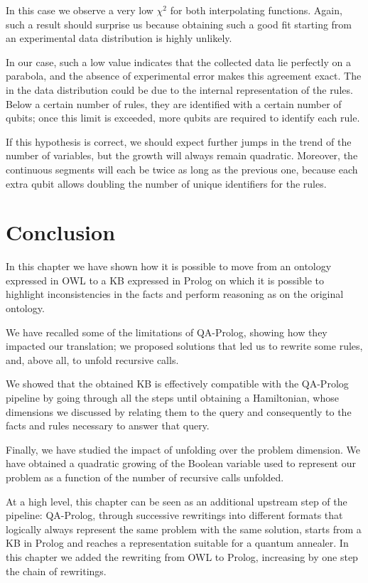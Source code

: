 In this case we observe a very low $\chi^2$ for both interpolating functions. Again, such a result should surprise us because obtaining such a good fit starting from an experimental data distribution is highly unlikely. 

In our case, such a low value indicates that the collected data lie perfectly on a parabola, and the absence of experimental error makes this agreement exact. The  in the data distribution could be due to the internal representation of the rules. Below a certain number of rules, they are identified with a certain number of qubits; once this limit is exceeded, more qubits are required to identify each rule. 

If this hypothesis is correct, we should expect further jumps in the trend of the number of variables, but the growth will always remain quadratic. Moreover, the continuous segments will each be twice as long as the previous one, because each extra qubit allows doubling the number of unique identifiers for the rules.

\section{Conclusion}
In this chapter we have shown how it is possible to move from an ontology expressed in OWL to a KB expressed in Prolog on which it is possible to highlight inconsistencies in the facts and perform reasoning as on the original ontology.

We have recalled some of the limitations of QA-Prolog, showing how they impacted our translation; we proposed solutions that led us to rewrite some rules, and, above all, to unfold recursive calls.

We showed that the obtained KB is effectively compatible with the QA-Prolog pipeline by going through all the steps until obtaining a Hamiltonian, whose dimensions we discussed by relating them to the query and consequently to the facts and rules necessary to answer that query.

Finally, we have studied the impact of unfolding over the problem dimension. We have obtained a quadratic growing of the Boolean variable used to represent our problem as a function of the number of recursive calls unfolded.

At a high level, this chapter can be seen as an additional upstream step of the pipeline: QA-Prolog, through successive rewritings into different formats that logically always represent the same problem with the same solution, starts from a KB in Prolog and reaches a representation suitable for a quantum annealer. In this chapter we added the rewriting from OWL to Prolog, increasing by one step the chain of rewritings.